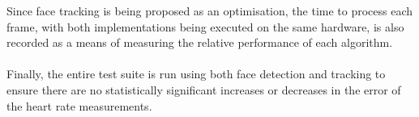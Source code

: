 Since face tracking is being proposed as an optimisation, the time to process each frame, with both implementations being executed on the same hardware, is also recorded as a means of measuring the relative performance of each algorithm.
\\\\
Finally, the entire test suite is run using both face detection and tracking to ensure there are no statistically significant increases or decreases in the error of the heart rate measurements.


